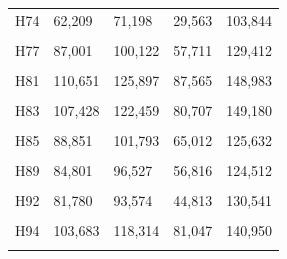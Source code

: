 \documentclass[
  a4paper,
  titlepage]{article}
\begin{document}
\begin{longtable}[t]{lllll}
H74 & 62,209 & 71,198 & 29,563 & 103,844\\
 
\cellcolor{gray!6}{H76} & \cellcolor{gray!6}{77,909} & \cellcolor{gray!6}{89,232} & \cellcolor{gray!6}{47,659} & \cellcolor{gray!6}{119,482}\\
 
H77 & 87,001 & 100,122 & 57,711 & 129,412\\
 
\cellcolor{gray!6}{H80} & \cellcolor{gray!6}{64,896} & \cellcolor{gray!6}{73,176} & \cellcolor{gray!6}{37,979} & \cellcolor{gray!6}{100,093}\\
 
H81 & 110,651 & 125,897 & 87,565 & 148,983\\
 
\cellcolor{gray!6}{H82} & \cellcolor{gray!6}{65,323} & \cellcolor{gray!6}{74,278} & \cellcolor{gray!6}{35,288} & \cellcolor{gray!6}{104,313}\\
 
H83 & 107,428 & 122,459 & 80,707 & 149,180\\
 
\cellcolor{gray!6}{H84} & \cellcolor{gray!6}{70,369} & \cellcolor{gray!6}{80,019} & \cellcolor{gray!6}{38,663} & \cellcolor{gray!6}{111,725}\\
 
H85 & 88,851 & 101,793 & 65,012 & 125,632\\
 
\cellcolor{gray!6}{H87} & \cellcolor{gray!6}{87,138} & \cellcolor{gray!6}{100,107} & \cellcolor{gray!6}{58,108} & \cellcolor{gray!6}{129,137}\\
 
H89 & 84,801 & 96,527 & 56,816 & 124,512\\
 
\cellcolor{gray!6}{H91} & \cellcolor{gray!6}{66,605} & \cellcolor{gray!6}{76,431} & \cellcolor{gray!6}{48,569} & \cellcolor{gray!6}{94,467}\\
 
H92 & 81,780 & 93,574 & 44,813 & 130,541\\
 
\cellcolor{gray!6}{H93} & \cellcolor{gray!6}{68,780} & \cellcolor{gray!6}{79,039} & \cellcolor{gray!6}{44,829} & \cellcolor{gray!6}{102,990}\\
 
H94 & 103,683 & 118,314 & 81,047 & 140,950\\
 
\cellcolor{gray!6}{H95} & \cellcolor{gray!6}{79,354} & \cellcolor{gray!6}{90,171} & \cellcolor{gray!6}{52,050} & \cellcolor{gray!6}{117,475}\\
 

\end{longtable}
\end{document}
